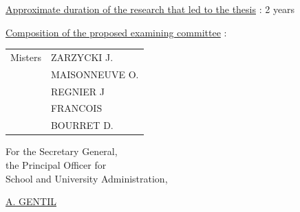 \uline{Approximate duration of the research that led to the thesis} : 2 years

\uline{Composition of the proposed examining committee} : \begin{tabular}[t]{ll}
Misters & ZARZYCKI J.\\
& MAISONNEUVE O.\\
& REGNIER J\\
& FRANCOIS\\
& BOURRET D.
\end{tabular}

\begin{flushright}
For the Secretary General,\\
the Principal Officer for\\
School and University Administration,


\uline{A. GENTIL}
\end{flushright}

